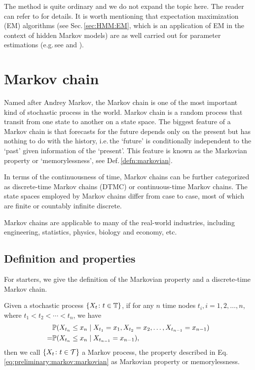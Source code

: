 The method is quite ordinary and we do not expand the topic here.
The reader can refer to \cite{Zucchini:2009df} for details.
It is worth mentioning that expectation maximization (EM) algorithms 
(see Sec.\,\ref{sec:HMM:EM}, which is an application of EM in the context of hidden Markov models)
are as well carried out for parameter estimations 
(e.g.\,see \cite{Mclachlan:2004fi} and \cite{Fruhwirth:2006fi}).


\section{Markov chain}
\label{sec:preliminary:markov}
Named after Andrey Markov,
the Markov chain is one of the most important kind of stochastic process in the world.
Markov chain is a random process that transit from one state to another on a state space.
The biggest feature of a Markov chain is that 
forecasts for the future depends only on the present but has nothing to do with the history,
i.e.\,the `future' is conditionally independent to the `past' given information of the `present'.
This feature is known as the Markovian property or `memorylessness', see Def.\,\ref{defn:markovian}.

In terms of the continuousness of time,
Markov chains can be further categorized as discrete-time Markov chains (DTMC) 
or continuous-time Markov chains.
The state spaces employed by Markov chains differ from case to case,
most of which are finite or countably infinite discrete.

Markov chains are applicable to many of the real-world industries,
including engineering, statistics, physics, biology and economy, etc.


\subsection{Definition and properties}
\label{sec:preliminary:markov:definition}
For starters, we give the definition of the Markovian property and a discrete-time Markov chain.

		\begin{defn}
		\label{defn:markovian}
		Given a stochastic process $\{X_t \colon t \in {\mathbb T}\}$,
		if for any $n$ time nodes $t_i,i=1,2,\dots,n$,
		where $t_1 < t_2 < \cdots < t_n$, we have
			\begin{equation}
			\label{eq:preliminary:markov:markovian}
			\begin{aligned}
			& \mathbb{P}(X_{t_n} \leq x_{n} \mid X_{t_1} = x_{1},X_{t_2} = x_{2},\dots,X_{t_{n-1}} = x_{n-1}) \\
			= & \mathbb{P}(X_{t_n} \leq x_{n} \mid X_{t_{n-1}} = x_{n-1}),
			\end{aligned}
			\end{equation}
		then we call $\{X_t \colon t \in {\cal T}\}$ a Markov process,
		the property described in Eq.\,\ref{eq:preliminary:markov:markovian} 
		as Markovian property or memorylessness.
		\end{defn}

